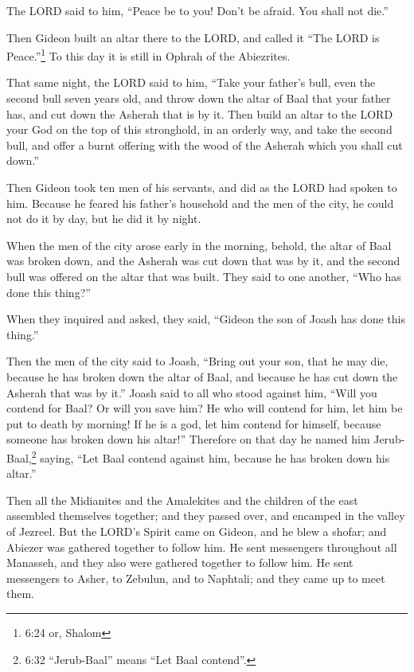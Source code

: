 \myverse{}The LORD said to him, “Peace be to you! Don’t be afraid. You
shall not die.”

\myverse{}Then Gideon built an altar there to the LORD, and called it “The
LORD is Peace.”\footnote{6:24 or, Shalom} To this day it is still in Ophrah of the Abiezrites.

\myverse{}That same night, the LORD said to him, “Take your father’s bull,
even the second bull seven years old, and throw down the altar of Baal that your father has, and cut down
the Asherah that is by it.
\myverse{}Then build an altar to the LORD your God on the top of this stronghold, in
an orderly way, and take the second bull, and offer a burnt offering with the wood of the Asherah which
you shall cut down.”

\myverse{}Then Gideon took ten men of his servants, and did as the LORD
had spoken to him. Because he feared his father’s household and the men of the city, he could not do it
by day, but he did it by night.

\myverse{}When the men of the city arose early in the morning, behold,
the altar of Baal was broken down, and the Asherah was cut down that was by it, and the second bull was
offered on the altar that was built.
\myverse{}They said to one another, “Who has done this thing?”

When they inquired and asked, they said, “Gideon the son of Joash has done this thing.”

\myverse{}Then the men of the city said to Joash, “Bring out your son,
that he may die, because he has broken down the altar of Baal, and because he has cut down the Asherah
that was by it.”
\myverse{}Joash said to all who stood against him, “Will you contend for Baal? Or will
you save him? He who will contend for him, let him be put to death by morning! If he is a god, let him
contend for himself, because someone has broken down his altar!”
\myverse{}Therefore on that day he named him Jerub-Baal,\footnote{6:32 “Jerub-Baal” means “Let Baal contend”.} saying, “Let Baal contend against him, because
he has broken down his altar.”

\myverse{}Then all the Midianites and the Amalekites and the children of
the east assembled themselves together; and they passed over, and encamped in the valley of Jezreel.
\myverse{}But the LORD’s Spirit came on Gideon, and he blew a shofar; and Abiezer was
gathered together to follow him.
\myverse{}He sent messengers throughout all Manasseh, and they also were gathered together
to follow him. He sent messengers to Asher, to Zebulun, and to Naphtali; and they came up to meet them.

